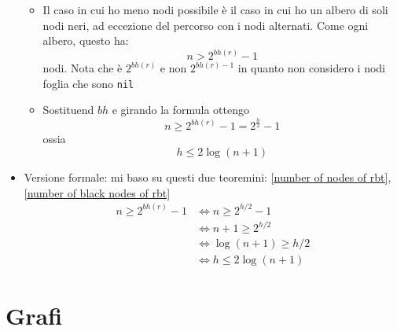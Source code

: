 \begin{itemize}
\begin{itemize}
		      \item Il caso in cui ho meno nodi possibile è il caso in cui ho un albero di soli nodi neri, ad eccezione del percorso con i nodi alternati. Come ogni albero, questo ha:
		            \[
			            n > 2^{bh\left(r\right)}-1
		            \]
		            nodi. Nota che è $ 2^{bh\left(r\right)} $ e non $ 2^{bh\left(r\right)-1} $ in quanto non considero i nodi foglia che sono \verb|nil|
		      \item Sostituend $ bh $ e girando la formula ottengo
		            \[
			            n \ge 2^{bh\left(r\right)}-1 = 2^{\frac{h}{2}} -1
		            \]
		            ossia
		            \[
			            h \le 2 \log \left(n+1\right)
		            \]
	      \end{itemize}
	\item Versione formale: mi baso su questi due teoremini: \ref{number of nodes of rbt}, \ref{number of black nodes of rbt}
	      \[
		      \begin{aligned}
			      n \geq 2^{b h(r)}-1 & \Leftrightarrow n \geq 2^{h / 2}-1    \\
			                          & \Leftrightarrow n+1 \geq 2^{h / 2}    \\
			                          & \Leftrightarrow \log (n+1) \geq h / 2 \\
			                          & \Leftrightarrow h \leq 2 \log (n+1)
		      \end{aligned}
	      \]
\end{itemize}
\section{Grafi}
